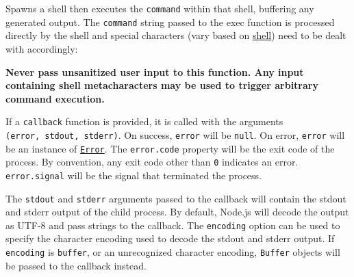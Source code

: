 Spawns a shell then executes the \texttt{command} within that shell,
buffering any generated output. The \texttt{command} string passed to
the exec function is processed directly by the shell and special
characters (vary based on
\href{https://en.wikipedia.org/wiki/List_of_command-line_interpreters}{shell})
need to be dealt with accordingly:

\begin{Shaded}
\begin{Highlighting}[]
\OperatorTok{=} \NormalTok{(}\NormalTok{)}\OperatorTok{;}

\NormalTok{(}\NormalTok{)}\OperatorTok{;}

\NormalTok{(}\SpecialCharTok{\textbackslash{}\textbackslash{}}\NormalTok{)}\OperatorTok{;}
\end{Highlighting}
\end{Shaded}

\textbf{Never pass unsanitized user input to this function. Any input
containing shell metacharacters may be used to trigger arbitrary command
execution.}

If a \texttt{callback} function is provided, it is called with the
arguments \texttt{(error,\ stdout,\ stderr)}. On success, \texttt{error}
will be \texttt{null}. On error, \texttt{error} will be an instance of
\href{errors.md\#class-error}{\texttt{Error}}. The \texttt{error.code}
property will be the exit code of the process. By convention, any exit
code other than \texttt{0} indicates an error. \texttt{error.signal}
will be the signal that terminated the process.

The \texttt{stdout} and \texttt{stderr} arguments passed to the callback
will contain the stdout and stderr output of the child process. By
default, Node.js will decode the output as UTF-8 and pass strings to the
callback. The \texttt{encoding} option can be used to specify the
character encoding used to decode the stdout and stderr output. If
\texttt{encoding} is
\texttt{\textquotesingle{}buffer\textquotesingle{}}, or an unrecognized
character encoding, \texttt{Buffer} objects will be passed to the
callback instead.

